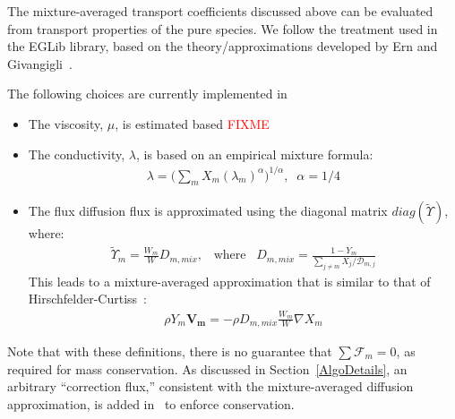 The mixture-averaged transport coefficients discussed above can be evaluated from transport properties of the pure species. We follow the treatment used in the EGLib library, based on the theory/approximations developed by Ern and Givangigli~\cite{Ern:1994,Ern:2004}.

The following choices are currently implemented in \pelelm\ 
\begin{itemize}
\item The viscosity, $\mu$, is estimated based \textcolor{red}{FIXME}
\item The conductivity, $\lambda$, is based on an empirical mixture formula:
\begin{eqnarray*}
\lambda = \Big( \sum_m X_m (\lambda_m)^{\alpha} \Big)^{1/\alpha}, \;\; \alpha = 1/4
\end{eqnarray*}
\item The flux diffusion flux is approximated using the diagonal matrix $diag(\widetilde{ \Upsilon})$, where:
\begin{eqnarray}
\widetilde{ \Upsilon}_m = \frac{W_m}{W} D_{m,mix}, \;\;\;\mbox{where} \;\;\; D_{m,mix} = \frac{1-Y_m}{ \sum_{j \neq m} X_j / \mathcal{D}_{m,j}}
\label{eq:dmix}
\end{eqnarray}
This leads to a mixture-averaged approximation that is similar to that of Hirschfelder-Curtiss~\cite{Hirschfelder:1954}:
\begin{eqnarray*}
\rho Y_m \boldsymbol{V_m} = - \rho D_{m,mix} \frac{W_m}{W} \nabla X_m 
\end{eqnarray*}
\end{itemize}
Note that with these definitions, there is no guarantee that $\sum \boldsymbol{\mathcal{F}}_{m} = 0$, as
required for mass conservation. As discussed in Section~\ref{AlgoDetails}, an arbitrary ``correction flux,'' consistent with the mixture-averaged diffusion approximation, is added in \pelelm\ to enforce conservation.


